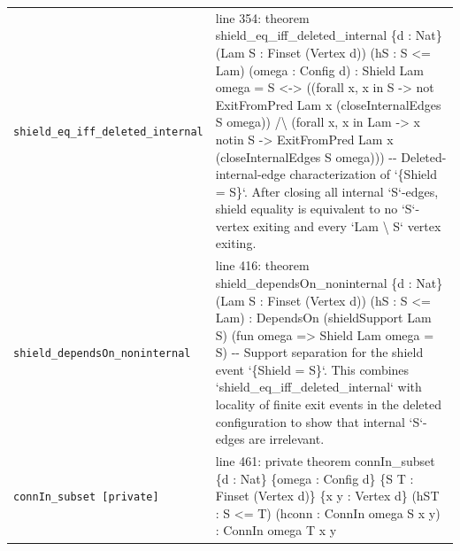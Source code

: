 \documentclass[10pt]{article}
\begin{document}
\begin{longtable}{>{\raggedright\arraybackslash}p{} >{\raggedright\arraybackslash}p{}}
\texttt{shield\_\allowbreak{}eq\_\allowbreak{}iff\_\allowbreak{}deleted\_\allowbreak{}internal} & {\ttfamily\scriptsize line 354:\allowbreak{} theorem shield\_\allowbreak{}eq\_\allowbreak{}iff\_\allowbreak{}deleted\_\allowbreak{}internal \{d :\allowbreak{} Nat\} (\allowbreak{}Lam S :\allowbreak{} Finset (\allowbreak{}Vertex d)\allowbreak{})\allowbreak{} (\allowbreak{}hS :\allowbreak{} S <=\allowbreak{} Lam)\allowbreak{} (\allowbreak{}omega :\allowbreak{} Config d)\allowbreak{} :\allowbreak{} Shield Lam omega =\allowbreak{} S <-\allowbreak{}> (\allowbreak{}(\allowbreak{}forall x,\allowbreak{} x in S -\allowbreak{}> not ExitFromPred Lam x (\allowbreak{}closeInternalEdges S omega)\allowbreak{})\allowbreak{} /\allowbreak{}\textbackslash{} (\allowbreak{}forall x,\allowbreak{} x in Lam -\allowbreak{}> x notin S -\allowbreak{}> ExitFromPred Lam x (\allowbreak{}closeInternalEdges S omega)\allowbreak{})\allowbreak{})\allowbreak{} -\allowbreak{}-\allowbreak{} Deleted-\allowbreak{}internal-\allowbreak{}edge characterization of `\{Shield =\allowbreak{} S\}`.\allowbreak{} After closing all internal `S`-\allowbreak{}edges,\allowbreak{} shield equality is equivalent to no `S`-\allowbreak{}vertex exiting and every `Lam \textbackslash{} S` vertex exiting.\allowbreak{}} \\[0.45em]
\texttt{shield\_\allowbreak{}dependsOn\_\allowbreak{}noninternal} & {\ttfamily\scriptsize line 416:\allowbreak{} theorem shield\_\allowbreak{}dependsOn\_\allowbreak{}noninternal \{d :\allowbreak{} Nat\} (\allowbreak{}Lam S :\allowbreak{} Finset (\allowbreak{}Vertex d)\allowbreak{})\allowbreak{} (\allowbreak{}hS :\allowbreak{} S <=\allowbreak{} Lam)\allowbreak{} :\allowbreak{} DependsOn (\allowbreak{}shieldSupport Lam S)\allowbreak{} (\allowbreak{}fun omega =\allowbreak{}> Shield Lam omega =\allowbreak{} S)\allowbreak{} -\allowbreak{}-\allowbreak{} Support separation for the shield event `\{Shield =\allowbreak{} S\}`.\allowbreak{} This combines `shield\_\allowbreak{}eq\_\allowbreak{}iff\_\allowbreak{}deleted\_\allowbreak{}internal` with locality of finite exit events in the deleted configuration to show that internal `S`-\allowbreak{}edges are irrelevant.\allowbreak{}} \\[0.45em]
\texttt{connIn\_\allowbreak{}subset [private]} & {\ttfamily\scriptsize line 461:\allowbreak{} private theorem connIn\_\allowbreak{}subset \{d :\allowbreak{} Nat\} \{omega :\allowbreak{} Config d\} \{S T :\allowbreak{} Finset (\allowbreak{}Vertex d)\allowbreak{}\} \{x y :\allowbreak{} Vertex d\} (\allowbreak{}hST :\allowbreak{} S <=\allowbreak{} T)\allowbreak{} (\allowbreak{}hconn :\allowbreak{} ConnIn omega S x y)\allowbreak{} :\allowbreak{} ConnIn omega T x y} \\[0.45em]

\end{longtable}
\end{document}
